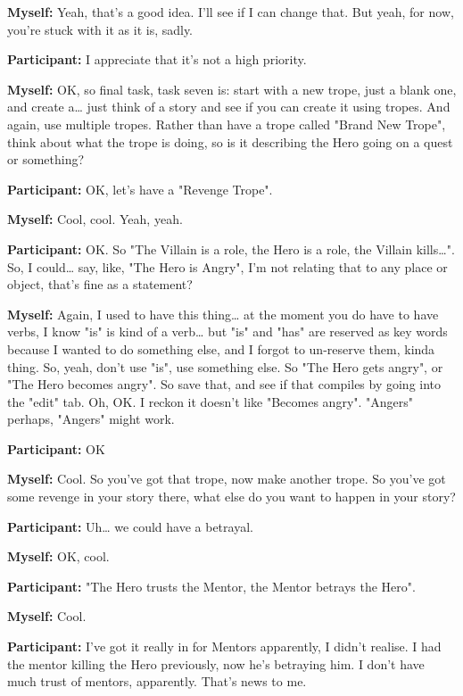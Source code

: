\documentclass[11pt]{report}
\begin{document}
\begin{linenumbers}
\textbf{Myself:} Yeah, that's a good idea. I'll see if I can change that. But yeah, for now, you're stuck with it as it is, sadly.

\textbf{Participant:} I appreciate that it's not a high priority.

\textbf{Myself:} OK, so final task, task seven is: start with a new trope, just a blank one, and create a\ldots{} just think of a story and see if you can create it using tropes. And again, use multiple tropes. Rather than have a trope called "Brand New Trope", think about what the trope is doing, so is it describing the Hero going on a quest or something?

\textbf{Participant:} OK, let's have a "Revenge Trope".

\textbf{Myself:} Cool, cool. Yeah, yeah.

\textbf{Participant:} OK. So "The Villain is a role, the Hero is a role, the
Villain kills\ldots{}". So, I could\ldots{} say, like, "The Hero is Angry", I'm
not relating that to any place or object, that's fine as a
statement?

\textbf{Myself:} Again, I used to have this thing\ldots{} at the moment you do have to have verbs, I know "is" is kind of a verb\ldots{} but "is" and "has" are reserved as key words because I wanted to do something else, and I forgot to un-reserve them, kinda thing. So, yeah, don't use "is", use something else. So "The Hero gets angry", or "The Hero becomes angry". So save that, and see if that compiles by going into the "edit" tab. Oh, OK. I reckon it doesn't like "Becomes angry". "Angers" perhaps, "Angers" might work.

\textbf{Participant:} OK

\textbf{Myself:} Cool. So you've got that trope, now make another trope. So you've got some revenge in your story there, what else do you want to happen in your story?

\textbf{Participant:} Uh\ldots{} we could have a betrayal.

\textbf{Myself:} OK, cool.

\textbf{Participant:} "The Hero trusts the Mentor, the Mentor betrays the Hero".

\textbf{Myself:} Cool.

\textbf{Participant:} I've got it really in for Mentors apparently, I didn't realise. I had the mentor killing the Hero previously, now he's betraying him. I don't have much trust of mentors, apparently. That's news to me.


\end{linenumbers}
\end{document}
